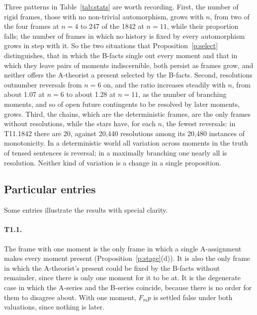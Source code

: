 \documentclass{situationist-preprint}
\begin{document}
Three patterns in Table~\ref{tab:stats} are worth recording. First, the number of rigid frames, those with no non-trivial automorphism, grows with $n$, from two of the four frames at $n = 4$ to 247 of the 1842 at $n = 11$, while their proportion falls; the number of frames in which no history is fixed by every automorphism grows in step with it. So the two situations that Proposition~\ref{p:select} distinguishes, that in which the B-facts single out every moment and that in which they leave pairs of moments indiscernible, both persist as frames grow, and neither offers the A-theorist a present selected by the B-facts. Second, resolutions outnumber reversals from $n = 6$ on, and the ratio increases steadily with $n$, from about 1.07 at $n = 6$ to about 1.28 at $n = 11$, as the number of branching moments, and so of open future contingents to be resolved by later moments, grows. Third, the chains, which are the deterministic frames, are the only frames without resolutions, while the stars have, for each $n$, the fewest reversals: in T11.1842 there are 20, against 20,440 resolutions among its 20,480 instances of monotonicity. In a deterministic world all variation across moments in the truth of tensed sentences is reversal; in a maximally branching one nearly all is resolution. Neither kind of variation is a change in a single proposition.

\subsection{Particular entries}

Some entries illustrate the results with special clarity.

\paragraph{T1.1.} The frame with one moment is the only frame in which a single A-assignment makes every moment present (Proposition~\ref{p:stage}(d)). It is also the only frame in which the A-theorist's present could be fixed by the B-facts without remainder, since there is only one moment for it to be at. It is the degenerate case in which the A-series and the B-series coincide, because there is no order for them to disagree about. With one moment, $F_m p$ is settled false under both valuations, since nothing is later.
\end{document}
